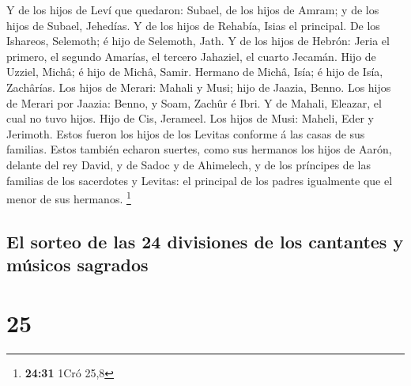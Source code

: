  Y de los hijos de Leví que quedaron: Subael, de los
hijos de Amram; y de los hijos de Subael, Jehedías.  Y de
los hijos de Rehabía, Isias el principal.  De los
Ishareos, Selemoth; é hijo de Selemoth, Jath.  Y de los
hijos de Hebrón: Jeria el primero, el segundo Amarías, el tercero
Jahaziel, el cuarto Jecamán.  Hijo de Uzziel, Michâ; é
hijo de Michâ, Samir.  Hermano de Michâ, Isía; é hijo de
Isía, Zachârías.  Los hijos de Merari: Mahali y Musi;
hijo de Jaazia, Benno.  Los hijos de Merari por Jaazia:
Benno, y Soam, Zachûr é Ibri.  Y de Mahali, Eleazar, el
cual no tuvo hijos.  Hijo de Cis, Jerameel.
 Los hijos de Musi: Maheli, Eder y Jerimoth. Estos fueron
los hijos de los Levitas conforme á las casas de sus familias.
 Estos también echaron suertes, como sus hermanos los
hijos de Aarón, delante del rey David, y de Sadoc y de Ahimelech, y de
los príncipes de las familias de los sacerdotes y Levitas: el principal
de los padres igualmente que el menor de sus hermanos. \footnote{\textbf{24:31}
  1Cró 25,8}

\hypertarget{el-sorteo-de-las-24-divisiones-de-los-cantantes-y-muxfasicos-sagrados}{%
\subsection{El sorteo de las 24 divisiones de los cantantes y músicos
sagrados}\label{el-sorteo-de-las-24-divisiones-de-los-cantantes-y-muxfasicos-sagrados}}

\hypertarget{section-24}{%
\section{25}\label{section-24}}

